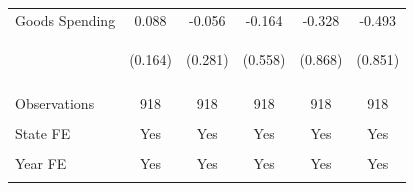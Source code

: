\documentclass[dv_diss_main.tex]{subfiles}
\begin{document}
\begin{table}[H]
\begin{center}
\begin{tabular}{lccccc}
    Goods Spending & 0.088 & -0.056 & -0.164 & -0.328 & -0.493 \\
     & \begin{footnotesize}(0.164)\end{footnotesize} & \begin{footnotesize}(0.281)\end{footnotesize} & \begin{footnotesize}(0.558)\end{footnotesize} & \begin{footnotesize}(0.868)\end{footnotesize} & \begin{footnotesize}(0.851)\end{footnotesize} \\

    \vspace{4pt} & \begin{footnotesize}\end{footnotesize} & \begin{footnotesize}\end{footnotesize} & \begin{footnotesize}\end{footnotesize} & \begin{footnotesize}\end{footnotesize} & \begin{footnotesize}\end{footnotesize} \\
    Observations & 918 & 918 & 918 & 918 & 918 \\
    \vspace{-2pt} & \vspace{-2pt} & \vspace{-2pt} & \vspace{-2pt} & \vspace{-2pt} \\
    State FE & Yes & Yes & Yes & Yes & Yes \\
    \vspace{-2pt} & \vspace{-2pt} & \vspace{-2pt} & \vspace{-2pt} & \vspace{-2pt} \\
    Year FE & Yes & Yes & Yes & Yes & Yes \\
    \vspace{-2pt} & \vspace{-2pt} & \vspace{-2pt} & \vspace{-2pt} & \vspace{-2pt} \\

\end{tabular}
\end{center}
\end{table}
\end{document}
